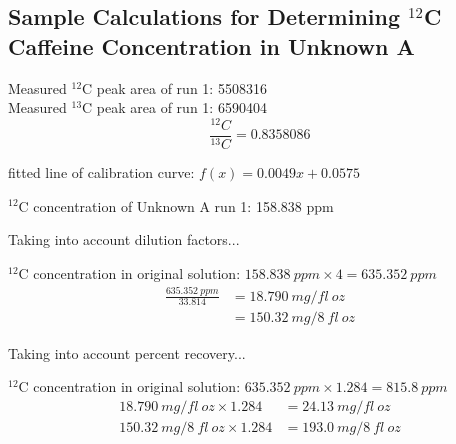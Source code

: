 \documentclass{article}
\begin{document}
\begin{center}
\subsection*{Sample Calculations for Determining $^{12}$C Caffeine Concentration
in Unknown A}
\vspace{2cm}

    Measured $^{12}$C peak area of run 1: 5508316 \\
    \vspace{0.5cm}
    Measured $^{13}$C peak area of run 1: 6590404 \\
    \begin{equation*}
        \frac{^{12}C}{^{13}C} = 0.8358086
    \end{equation*}
    
    \vspace{1cm}
    fitted line of calibration curve: $f(x) = 0.0049x + 0.0575$ \\ 
    \vspace{1cm}

    $^{12}$C concentration of Unknown A run 1: 158.838 ppm \\
    \vspace{1cm}

    Taking into account dilution factors...
    \vspace{1cm}

    $^{12}$C concentration in original solution: 
    $158.838\ ppm \times 4 = 635.352\ ppm$ \\

    \begin{align*}
        \frac{635.352\ ppm}{33.814} &= 18.790\ mg/fl\ oz \\
        &= 150.32\ mg/8\ fl\ oz
    \end{align*}

    \vspace{1cm}
    Taking into account percent recovery...
    \vspace{1cm}

    $^{12}$C concentration in original solution: 
    $635.352\ ppm \times  1.284 = 815.8\ ppm$ \\

    \begin{align*}
        18.790\ mg/fl\ oz \times 1.284 &= 24.13\ mg/fl\ oz \\
        150.32\ mg/8\ fl\ oz  \times 1.284 &= 193.0\ mg/8\ fl\ oz
    \end{align*}

\end{center}
\end{document}
